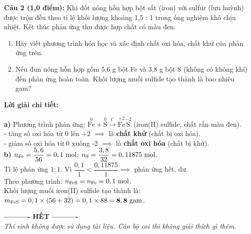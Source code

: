 \documentclass[10.5pt,a4paper]{article}
\newcommand{\loigiai}[1]{%
  \vspace{1pt}
  \begin{tcolorbox}
  {\color{myBlue}\bfseries Lời giải chi tiết:}\par\vspace{1pt}
  {\small #1}
  \end{tcolorbox}
  \vspace{2pt}
}
\begin{document}
\textbf{Câu 2 (1,0 điểm):} Khi đốt nóng hỗn hợp bột sắt (iron) với sulfur (lưu huỳnh) được trộn đều theo tỉ lệ khối lượng khoảng 1,5 : 1 trong ống nghiệm khô chịu nhiệt. Kết thúc phản ứng thu được hợp chất có màu đen.
\begin{enumerate}[label=\alph*), itemsep=1.5pt, topsep=1pt, leftmargin=0.8cm]
    \item Hãy viết phương trình hóa học và xác định chất oxi hóa, chất khử của phản ứng trên.
    \item Nếu đun nóng hỗn hợp gồm 5,6 g bột Fe và 3,8 g bột S (không có không khí) đến phản ứng hoàn toàn. Khối lượng muối sulfide tạo thành là bao nhiêu gam?
\end{enumerate}
\loigiai{
\textbf{a)} Phương trình phản ứng: $\overset{0}{\text{Fe}} + \overset{0}{\text{S}} \xrightarrow{t^\circ} \overset{+2}{\text{Fe}}\overset{-2}{\text{S}}$ (iron(II) sulfide, chất rắn màu đen).\\
- \ce{Fe} tăng số oxi hóa từ 0 lên +2 $\implies$ \ce{Fe} là \textbf{chất khử} (chất bị oxi hóa).\\
- \ce{S} giảm số oxi hóa từ 0 xuống -2 $\implies$ \ce{S} là \textbf{chất oxi hóa} (chất bị khử).\\
\textbf{b)} $n_{\ce{Fe}} = \dfrac{5,6}{56} = 0,1\text{ mol}$; $n_{\ce{S}} = \dfrac{3,8}{32} = 0,11875\text{ mol}$.\\
Tỉ lệ phản ứng $1 : 1$. Vì $\dfrac{0,1}{1} < \dfrac{0,11875}{1} \implies$ \ce{Fe} phản ứng hết, \ce{S} dư.\\
Theo phương trình: $n_{\ce{FeS}} = n_{\ce{Fe}} = 0,1\text{ mol}$.\\
Khối lượng muối iron(II) sulfide tạo thành là:\\
$m_{\ce{FeS}} = 0,1 \times (56 + 32) = 0,1 \times 88 = \mathbf{8,8\text{ gam}}$.
}

\begin{center}
\textbf{---------- HẾT ----------}\\
\textit{\small Thí sinh không được sử dụng tài liệu. Cán bộ coi thi không giải thích gì thêm.}
\end{center}
\end{document}
